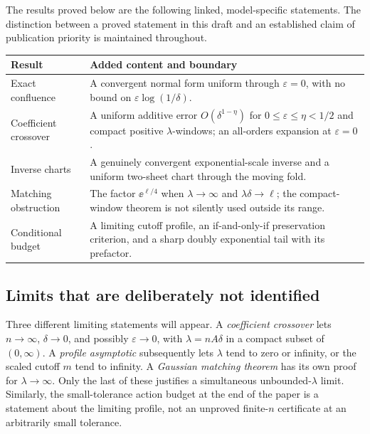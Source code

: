 \documentclass[11pt,a4paper]{article}
\numberwithin{equation}{section}
\theoremstyle{definition}
\theoremstyle{remark}
\newcommand{\ep}{\varepsilon}\newcommand{\la}{\lambda}
\begin{document}
The results proved below are the following linked, model-specific
statements. The distinction between a proved statement in this draft and
an established claim of publication priority is maintained throughout.
\begin{center}
\small
\begin{tabular}{p{}p{}}
\toprule
Result & Added content and boundary \\
\midrule
Exact confluence & A convergent normal form uniform through \(\ep=0\),
with no bound on \(\ep\log(1/\delta)\). \\
Coefficient crossover & A uniform additive error
\(O(\delta^{1-\eta})\) for \(0\le\ep\le\eta<1/2\) and compact positive
\(\la\)-windows; an all-orders expansion at \(\ep=0\). \\
Inverse charts & A genuinely convergent exponential-scale inverse and a
uniform two-sheet chart through the moving fold. \\
Matching obstruction & The factor \(\ee^{\ell/4}\) when
\(\la\to\infty\) and \(\la\delta\to\ell\); the compact-window theorem is
not silently used outside its range. \\
Conditional budget & A limiting cutoff profile, an if-and-only-if
preservation criterion, and a sharp doubly exponential tail with its
prefactor. \\
\bottomrule
\end{tabular}
\end{center}

\subsection{Limits that are deliberately not identified}
Three different limiting statements will appear. A \emph{coefficient
crossover} lets \(n\to\infty\), \(\delta\to0\), and possibly \(\ep\to0\),
with \(\la=nA\delta\) in a compact subset of \((0,\infty)\).
A \emph{profile asymptotic} subsequently lets \(\la\) tend to zero or
infinity, or the scaled cutoff \(m\) tend to infinity. A \emph{Gaussian
matching theorem} has its own proof for \(\la\to\infty\).
Only the last of these justifies a simultaneous unbounded-\(\la\) limit.
Similarly, the small-tolerance action budget at the end of the paper is a
statement about the limiting profile, not an unproved finite-\(n\)
certificate at an arbitrarily small tolerance.
\end{document}
